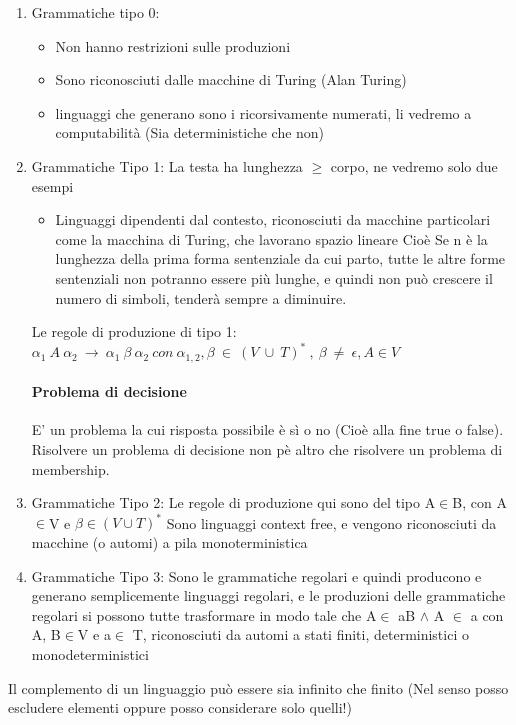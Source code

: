 \documentclass[12pt, a4paper, openany, oneside]{book}
\begin{document}
\begin{enumerate}
	\item Grammatiche tipo 0: %
	\begin{itemize}
		\item Non hanno restrizioni sulle produzioni
		\item Sono riconosciuti dalle macchine di Turing (Alan Turing)
		\item linguaggi che generano sono i ricorsivamente numerati, li vedremo a 
		computabilità (Sia deterministiche che non)
	\end{itemize}
	\item Grammatiche Tipo 1: La testa ha lunghezza $\geq$ corpo, ne vedremo 
	solo due esempi
	\begin{itemize}
		\item Linguaggi dipendenti dal contesto, riconosciuti da macchine 
		particolari come la macchina di Turing, che lavorano spazio lineare
		Cioè Se n è la lunghezza della prima forma sentenziale da cui parto, 
		tutte le altre forme sentenziali non potranno essere più lunghe, e quindi
		non può crescere il numero di simboli, tenderà sempre a diminuire.
	\end{itemize}
	Le regole di produzione di tipo 1:
	$\alpha _{1} ~ A ~ \alpha _{2} ~ \to ~ \alpha _{1}~ \beta ~ \alpha_{2} ~ con ~ \alpha _{1,2}
	,\beta ~ \in ~ (V ~ \cup ~ T)^{*} ~ , ~ \beta ~ \neq ~ \epsilon, A\in V$
	\paragraph{Problema di decisione} E' un problema la cui risposta possibile è
	sì o no (Cioè alla fine true o false). Risolvere un problema di decisione non 
	pè altro che risolvere un problema di membership.
	\item Grammatiche Tipo 2: 
	Le regole di produzione qui sono del tipo A$\in$B, con A$\in$V e 
	$\beta \in(V \cup T)^{*}$
	Sono linguaggi context free, e vengono riconosciuti da macchine (o automi) a
	pila monoterministica
	\item Grammatiche Tipo 3: Sono le grammatiche regolari e quindi producono e
	generano semplicemente linguaggi regolari, e le produzioni delle grammatiche
	regolari si possono tutte trasformare in modo tale che A$\in$ aB $\wedge$ A
	$\in$ a con A, B$\in$V e a$\in$ T, riconosciuti da automi a stati finiti, 
	deterministici o monodeterministici
\end{enumerate}
Il complemento di un linguaggio può essere sia infinito che finito (Nel senso
posso escludere elementi oppure posso considerare solo quelli!)
\\ \\ 
\end{document}
